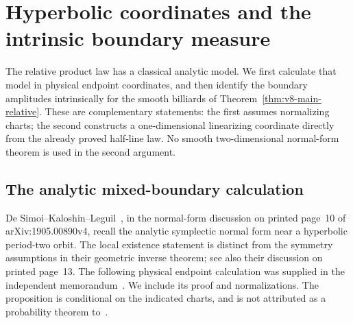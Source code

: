 \section{Hyperbolic coordinates and the intrinsic boundary measure}
\label{sec:v14-hyperbolic}
The relative product law has a classical analytic model. We first
calculate that model in physical endpoint coordinates, and then identify
the boundary amplitudes intrinsically for the smooth billiards of
Theorem~\ref{thm:v8-main-relative}. These are complementary statements:
the first assumes normalizing charts; the second constructs a
one-dimensional linearizing coordinate directly from the already proved
half-line law. No smooth two-dimensional normal-form theorem is used in
the second argument.

\subsection{The analytic mixed-boundary calculation}
De Simoi--Kaloshin--Leguil~\cite{DSKL}, in the normal-form discussion on
printed page~10 of arXiv:1905.00890v4, recall the analytic symplectic
normal form near a hyperbolic period-two orbit. The local existence
statement is distinct from the symmetry assumptions in their geometric
inverse theorem; see also their discussion on printed page~13.
The following physical endpoint calculation was supplied in the
independent memorandum~\cite{A2ReviewV13NF}. We include its proof and
normalizations. The proposition is conditional on the indicated charts,
and is not attributed as a probability theorem to~\cite{DSKL}.

